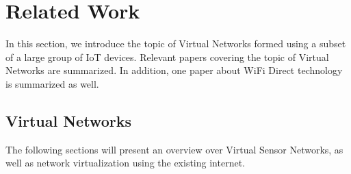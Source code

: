 \documentclass[journal]{IEEEtran}
\begin{document}

\section{Related Work}
In this section, we introduce the topic of Virtual Networks formed using a subset of a large group of IoT devices. Relevant papers covering the topic of Virtual Networks are summarized. In addition, one paper about WiFi Direct technology is summarized as well.

\subsection{Virtual Networks}
The following sections will present an overview over Virtual Sensor Networks, as well as network virtualization using the existing internet.
\end{document}
